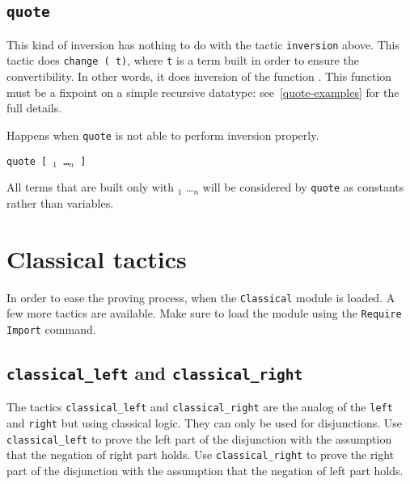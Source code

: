 \begin{coq_example*}
\subsection{\tt quote \ident}

This kind of inversion has nothing to do with the tactic
\texttt{inversion} above. This tactic does \texttt{change (\ident\
  t)}, where \texttt{t} is a term built in order to ensure the
convertibility. In other words, it does inversion of the function
\ident. This function must be a fixpoint on a simple recursive
datatype: see~\ref{quote-examples} for the full details.

\begin{ErrMsgs}
\item {}

  Happens when \texttt{quote} is not able to perform inversion properly.
\end{ErrMsgs}

\begin{Variants}
\item \texttt{quote {\ident} [ \ident$_1$ \dots \ident$_n$ ]}

  All terms that are built only with \ident$_1$ \dots \ident$_n$ will be
  considered by \texttt{quote} as constants rather than variables.
\end{Variants}


\section{Classical tactics}
\label{ClassicalTactics}

In order to ease the proving process, when the {\tt Classical} module is loaded. A few more tactics are available. Make sure to load the module using the \texttt{Require Import} command.

\subsection{{\tt classical\_left} and \tt classical\_right}

The tactics \texttt{classical\_left} and \texttt{classical\_right} are the analog of the \texttt{left} and \texttt{right} but using classical logic. They can only be used for disjunctions.
Use  \texttt{classical\_left} to prove the left part of the disjunction with the assumption that the negation of right part holds.
Use \texttt{classical\_right} to prove the right part of the disjunction with the assumption that the negation of left part holds.


\end{coq_example*}
